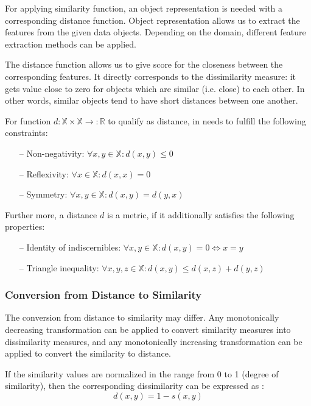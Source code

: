 For applying similarity function, an object representation is needed with a corresponding distance function. 
Object representation allows us to extract the features from the given data objects. 
Depending on the domain, different feature extraction methods can be applied. 

The distance function allows us to give score for the closeness between the corresponding features.
It directly corresponds to the dissimilarity measure: it gets value close to zero for objects which are similar (i.e. close) to each other. 
In other words, similar objects tend to have short distances between one another.

For function $d:\mathds{X} \times \mathds{X} \rightarrow :\mathds{R}$ to qualify as distance, in needs to fulfill the following constraints\cite{Deza.Deza2009EncyclopediaofDistances}:
\begin{itemize}
	\item[--] Non-negativity: $\forall x,y \in \mathds{X}: d(x,y) \leqslant 0$
	\item[--] Reflexivity: $\forall x \in \mathds{X}: d(x,x) = 0$
	\item[--] Symmetry: $\forall x,y \in \mathds{X}: d(x,y) = d(y,x)$
\end{itemize}

Further more, a distance $d$ is a metric, if it additionally satisfies the following properties:
\begin{itemize}
	\item[--] Identity of indiscernibles: $\forall x,y \in \mathds{X}: d(x,y) = 0 \Leftrightarrow x=y$
	\item[--] Triangle inequality: $\forall x,y,z \in \mathds{X}: d(x,y) \leqslant d(x,z) + d(y,z)$
\end{itemize}

\subsubsection{Conversion from Distance to Similarity}

The conversion from distance to similarity may differ. 
Any monotonically decreasing transformation can be applied to convert similarity measures into dissimilarity measures, 
and any monotonically increasing transformation can be applied to convert the similarity to distance.

If the similarity values are normalized in the range from 0 to 1 (degree of similarity), then the corresponding dissimilarity can be expressed as : 
\begin{equation}
d(x,y) = 1 - s(x,y)
\label{dissim}
\end{equation}

